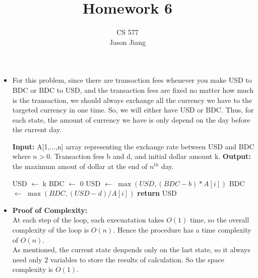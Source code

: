 \documentclass{article}
\author{CS 577\\Jason Jiang}
\title{Homework 6}
\begin{document}
    \maketitle
    \begin{enumerate}
            \begin{itemize}
        \item   

            For this problem, since there are transaction fees whenever you make USD to BDC or BDC to USD, and the transaction fees are fixed no matter how much is the transaction, we should always exchange all the currency we have to the targeted currency in one time. So, we will either have USD or BDC. Thus, for each state, the amount of currency we have is only depend on the day before the current day. \\

            \begin{algorithm}

                        \begin{algorithmic}
                     
                            \State \textbf{Input: } A[1,...,n] array representing the exchange rate between USD and BDC where $n > 0$. Transaction fees b and d, and initial dollar amount k. 
                            \State \textbf{Output: } the maximum amout of dollar at the end of $n^{th}$ day. 


                                \State USD $\leftarrow $ k
                                \State BDC $\leftarrow$ 0
                                    \State USD $\leftarrow $ $\max (USD, (BDC-b)*A[i])$
                                    \State BDC $\leftarrow$ $\max (BDC, (USD-d)/A[i])$
                                \EndFor
                                \State \textbf{return} USD
                            \EndProcedure
                        \end{algorithmic}
                    \end{algorithm}

                \item 
                    \textbf{Proof of Complexity:}\\
                     At each step of the loop, each execuatation takes $O(1)$ time, so the overall complexity of the loop is $O(n)$. Hence the procedure has a time complexity of $O(n)$. 
                     \\
                     As mentioned, the current state denpends only on the last state, so it always need only 2 variables to store the results of calculation. So the space complexity is $O(1)$. \\


\end{itemize}
\end{enumerate}
\end{document}
